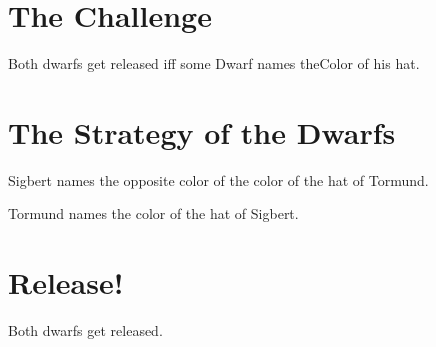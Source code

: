 \documentclass{article}
\begin{document}
\section{The Challenge}

\begin{forthel}

\begin{definition}
Both dwarfs get released iff some Dwarf names theColor of his hat.
\end{definition}

\end{forthel}


\section{The Strategy of the Dwarfs}

\begin{forthel}

\begin{axiom}
Sigbert names the opposite color of the color of the hat of Tormund.
\end{axiom}

\begin{axiom}
Tormund names the color of the hat of Sigbert.
\end{axiom}

\end{forthel}


\section{Release!}

\begin{forthel}

\begin{theorem}
Both dwarfs get released.
\end{theorem}

\end{forthel}
\end{document}
